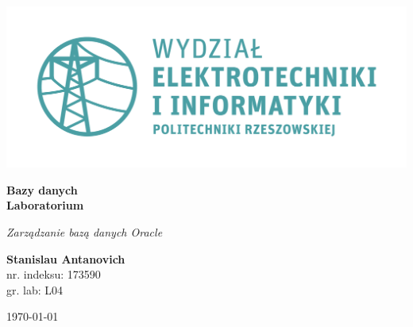\documentclass{article}
\begin{document}
\begin{titlepage}
\begin{center}
	\includegraphics[scale=0.7]{logo.png}

	\vspace*{4cm}
	\textbf{Bazy danych\\ Laboratorium}

	\vspace{1.5cm}
	\textit{Zarządzanie bazą danych Oracle}

	\vspace{1.5cm}
	\textbf{Stanislau Antanovich}\\
	nr. indeksu: 173590\\
	gr. lab: L04

	\vspace{4.5cm}
	\today
\end{center}
\end{titlepage}
\end{document}
